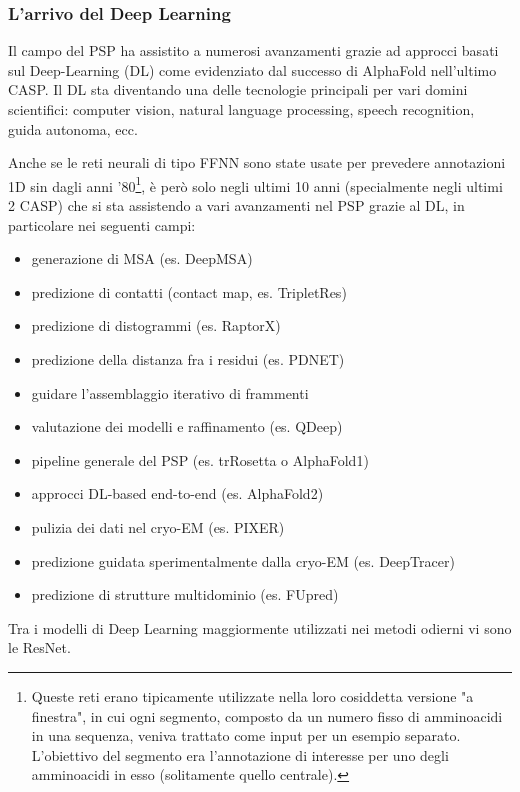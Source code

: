 \subsubsection{L'arrivo del Deep Learning}
{
Il campo del PSP ha assistito a numerosi avanzamenti grazie ad approcci basati sul Deep-Learning (DL) come evidenziato dal successo di AlphaFold nell'ultimo CASP. Il DL sta diventando una delle tecnologie principali per vari domini scientifici: computer vision, natural language processing, speech recognition, guida autonoma, ecc. 

Anche se le reti neurali di tipo FFNN sono state usate per prevedere annotazioni 1D sin dagli anni '80\supercite{torrisi2020deep}\footnote{Queste reti erano tipicamente utilizzate nella loro cosiddetta versione "a finestra", in cui ogni segmento, composto da un numero fisso di amminoacidi in una sequenza, veniva trattato come input per un esempio separato. L'obiettivo del segmento era l'annotazione di interesse per uno degli amminoacidi in esso (solitamente quello centrale).}, è però solo negli ultimi 10 anni (specialmente negli ultimi 2 CASP) che si sta assistendo a vari avanzamenti nel PSP grazie al DL, in particolare nei seguenti campi\supercite{pakhrin2021deep}:

\begin{itemize}
	\item generazione di MSA (es. DeepMSA)
	\item predizione di contatti (contact map, es. TripletRes)
	\item predizione di distogrammi (es. RaptorX)
	\item predizione della distanza fra i residui (es. PDNET)
	\item guidare l'assemblaggio iterativo di frammenti
	\item valutazione dei modelli e raffinamento (es. QDeep)
	\item pipeline generale del PSP (es. trRosetta o AlphaFold1)
	\item approcci DL-based end-to-end (es. AlphaFold2)
	\item pulizia dei dati nel cryo-EM (es. PIXER)
	\item predizione guidata sperimentalmente dalla cryo-EM (es. DeepTracer)
	\item predizione di strutture multidominio (es. FUpred)
\end{itemize}

Tra i modelli di Deep Learning maggiormente utilizzati nei metodi odierni vi sono le ResNet\supercite{pakhrin2021deep}.
}
